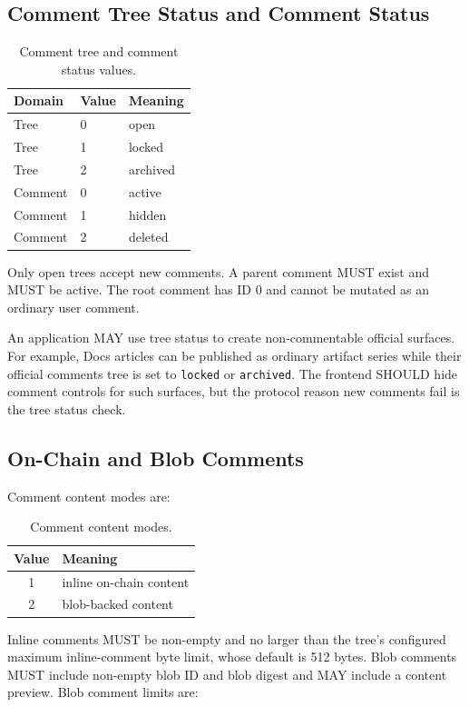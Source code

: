 \documentclass[11pt]{article}
\newcommand{\code}[1]{\texttt{#1}}
\begin{document}
\subsection{Comment Tree Status and Comment Status}

\begin{table}[htbp]
\centering
\caption{Comment tree and comment status values.}
\begin{tabular}{lll}
\toprule
\textbf{Domain} & \textbf{Value} & \textbf{Meaning} \\
\midrule
Tree & 0 & open \\
Tree & 1 & locked \\
Tree & 2 & archived \\
Comment & 0 & active \\
Comment & 1 & hidden \\
Comment & 2 & deleted \\
\bottomrule
\end{tabular}
\end{table}

Only open trees accept new comments. A parent comment MUST exist and MUST be active. The root comment has ID 0 and cannot be mutated as an ordinary user comment.

An application MAY use tree status to create non-commentable official surfaces.
For example, Docs articles can be published as ordinary artifact series while
their official comments tree is set to \code{locked} or \code{archived}. The
frontend SHOULD hide comment controls for such surfaces, but the protocol reason
new comments fail is the tree status check.

\subsection{On-Chain and Blob Comments}

Comment content modes are:

\begin{table}[htbp]
\centering
\caption{Comment content modes.}
\begin{tabular}{cl}
\toprule
\textbf{Value} & \textbf{Meaning} \\
\midrule
1 & inline on-chain content \\
2 & blob-backed content \\
\bottomrule
\end{tabular}
\end{table}

Inline comments MUST be non-empty and no larger than the tree's configured
maximum inline-comment byte limit, whose default is 512 bytes. Blob comments
MUST include non-empty blob ID and blob digest and MAY include a content
preview. Blob comment limits are:
\end{document}
